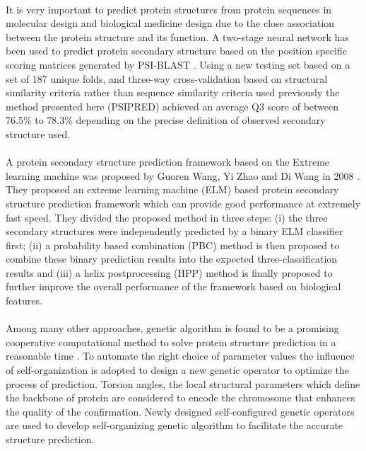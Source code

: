 \documentclass[12pt]{article}
\numberwithin{figure}{section}
\begin{document}
\paragraph{}
It is very important to predict protein structures from protein sequences in molecular design and biological medicine design due to the close association between the protein structure and its function. A two-stage neural network has been used to predict protein secondary structure based on the position specific scoring matrices generated by PSI-BLAST \cite{3}. Using a new testing set based on a set of 187 unique folds, and three-way cross-validation based on structural similarity criteria rather than sequence similarity criteria used previously the method presented here (PSIPRED) achieved an average Q3 score of between 76.5\% to 78.3\% depending on the precise definition of observed secondary structure used.
\paragraph{}
A protein secondary structure prediction framework based on the Extreme learning machine was proposed by Guoren Wang, Yi Zhao and Di Wang in 2008 \cite{4}. They proposed an extreme learning machine (ELM) based protein secondary structure prediction framework which can provide good performance at extremely fast speed. They divided the proposed method in three steps: (i) the three secondary structures were independently predicted by a binary ELM classifier first; (ii) a probability based combination (PBC) method is then proposed to combine these binary prediction results into the expected three-classification results and (iii) a helix postprocessing (HPP) method is finally proposed to further improve the overall performance of the framework based on biological features.
\paragraph{}
Among many other approaches, genetic algorithm is found to be a promising cooperative computational method to solve protein structure prediction in a reasonable time \cite{5}. To automate the right choice of parameter values the influence of self-organization is adopted to design a new genetic operator to optimize the process of prediction. Torsion angles, the local structural parameters which define the backbone of protein are considered to encode the chromosome that enhances the quality of the confirmation. Newly designed self-configured genetic operators are used to develop self-organizing genetic algorithm to facilitate the accurate structure prediction.
\end{document}
